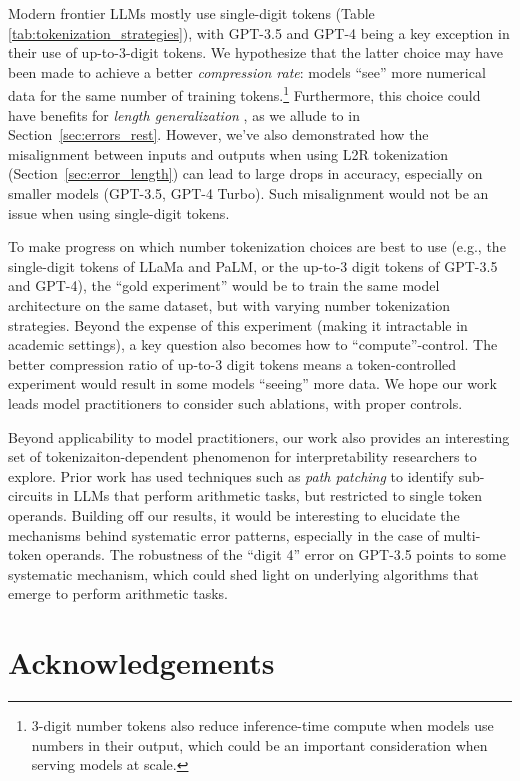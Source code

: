 \documentclass{article}
\theoremstyle{plain}
\theoremstyle{definition}
\theoremstyle{remark}
\begin{document}
Modern frontier LLMs mostly use single-digit tokens (Table \ref{tab:tokenization_strategies}), with GPT-3.5 and GPT-4 being a key exception in their use of up-to-3-digit tokens. We hypothesize that the latter choice may have been made to achieve a better \textit{compression rate}: models ``see'' more numerical data for the same number of training tokens.\footnote{3-digit number tokens also reduce inference-time compute when models use numbers in their output, which could be an important consideration when serving models at scale.} Furthermore, this choice could have benefits for \textit{length generalization} \cite{anil2022exploring}, as we allude to in Section~\ref{sec:errors_rest}. However, we've also demonstrated how the misalignment between inputs and outputs when using L2R tokenization (Section~\ref{sec:error_length}) can lead to large drops in accuracy, especially on smaller models (GPT-3.5, GPT-4 Turbo). Such misalignment would not be an issue when using single-digit tokens.

To make progress on which number tokenization choices are best to use (e.g., the single-digit tokens of LLaMa and PaLM, or the up-to-3 digit tokens of GPT-3.5 and GPT-4), the ``gold experiment'' would be to train the same model architecture on the same dataset, but with varying number tokenization strategies. Beyond the expense of this experiment (making it intractable in academic settings), a key question also becomes how to ``compute''-control. The better compression ratio of up-to-3 digit tokens means a token-controlled experiment would result in some models ``seeing'' more data. We hope our work leads model practitioners to consider such ablations, with proper controls.

Beyond applicability to model practitioners, our work also provides an interesting set of tokenizaiton-dependent phenomenon for interpretability researchers to explore. Prior work \cite{stolfo2023mechanistic} has used techniques such as \textit{path patching} to identify sub-circuits in LLMs that perform arithmetic tasks, but restricted to single token operands. Building off our results, it would be interesting to elucidate the mechanisms behind systematic error patterns, especially in the case of multi-token operands. The robustness of the ``digit 4'' error on GPT-3.5 points to some systematic mechanism, which could shed light on underlying algorithms that emerge to perform arithmetic tasks.

\section*{Acknowledgements}
\end{document}
